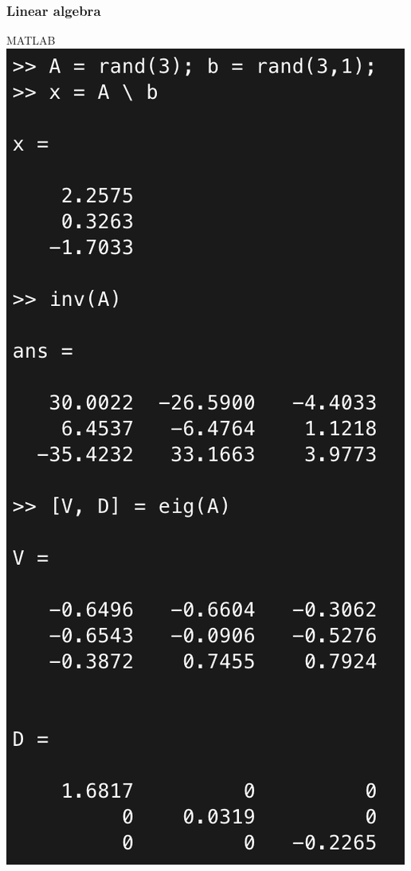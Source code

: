 \documentclass[compress]{beamer}
\begin{document}
\begin{frame}
	\frametitle{Linear algebra}
	\centering
	\begin{minipage}{0.35\textwidth}
		\centering
		MATLAB\\
		\includegraphics[width=\textwidth]{fig/matlab_la}

\end{minipage}
\end{frame}
\end{document}
